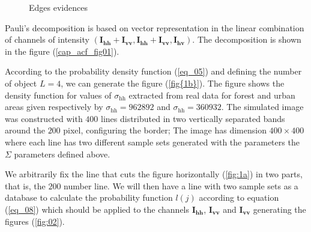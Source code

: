 \documentclass[conference]{IEEEtran}
\begin{document}
\begin{figure}[hbt]
    \caption{Edges evidences}
     \label{fig_Edges-Evidence}
\end{figure}

Pauli's decomposition is based on vector representation in the linear combination of channels of intensity $(\mathbf{I_\text{hh}+I_{\text{vv}}}, \mathbf{I_\text{hh}+I_{\text{vv}}}, \mathbf{I_\text{hv}})$. The decomposition is shown in the figure (\ref{cap_acf_fig01}). 

According to the probability density function (\ref{eq_05}) and defining the number of object $L=4$, we can generate the figure (\ref{fig{1b}}). The figure shows the density function for values of $\sigma_\text{hh}$ extracted from real data for forest and urban areas given respectively by $\sigma_\text{hh}=962892$ and $\sigma_\text{hh}= 360932$. 
%
The simulated image was constructed with $400$ lines distributed in two vertically separated bands around the $200$ pixel, configuring the border; The image has dimension $400 \times 400$ where each line has two different sample sets generated with the parameters the $\Sigma$ parameters defined above.  

We arbitrarily fix the line that cuts the figure horizontally (\ref{fig:1a}) in two parts, that is, the $200$ number line. We will then have a line with two sample sets as a database to calculate the probability function $l(j)$ according to equation (\ref{eq_08}) which should be applied to the channels $\mathbf{I_\text{hh}}$, $\mathbf{I_\text{vv}}$ and $\mathbf{I_{\text{vv}}}$ generating the figures (\ref{fig:02}).  
    
\end{document}
